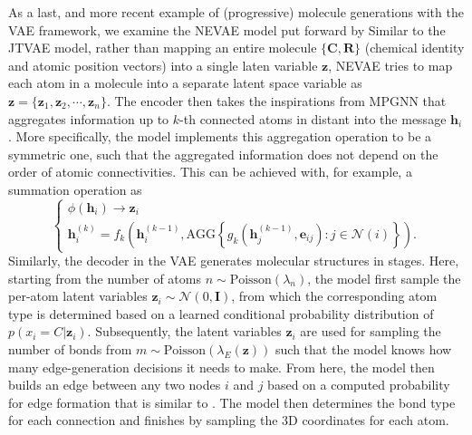 As a last, and more recent example of (progressive) molecule generations with the VAE framework, we examine the NEVAE model put forward by \citet{samanta2020nevae} Similar to the JTVAE model, rather than mapping an entire molecule $\{\bm{C},\bm{R}\}$ (chemical identity and atomic position vectors) into a single laten variable $\bm{z}$, NEVAE tries to map each atom in a molecule into a separate latent space variable as $\bm{z}=\{\bm{z}_1,\bm{z}_2,\cdots, \bm{z}_n\}$. The encoder then takes the inspirations from MPGNN that aggregates information up to $k$-th connected atoms in distant into the message $\bm{h}_i$. More specifically, the model implements this aggregation operation to be a symmetric one, such that the aggregated information does not depend on the order of atomic connectivities. This can be achieved with, for example, a summation operation as
\begin{equation*}
    \begin{cases}
        \phi(\bm{h}_i) \to\bm{z}_i\\
        \bm{h}_{i}^{(k)}=f_k\left( \bm{h}_i^{(k-1)},\mbox{AGG}\left\{  g_k\left(\bm{h}_j^{(k-1)},\bm{e}_{ij}\right): j\in \mathcal{N}(i)\right\} \right).
    \end{cases}
\end{equation*}
Similarly, the decoder in the VAE generates molecular structures in stages. Here, starting from the number of atoms $n\sim\mbox{Poisson}(\lambda_n)$, the model first sample the per-atom latent variables $\bm{z}_i\sim\mathcal{N}(0,\bm{I})$, from which the corresponding atom type is determined based on a learned conditional probability distribution of $p(x_i=C|\bm{z}_i)$. Subsequently, the latent variables $\bm{z}_i$ are used for sampling the number of bonds from $m\sim\mbox{Poisson}(\lambda_{E}(\bm{z}))$ such that the model knows how many edge-generation decisions it needs to make. From here, the model then builds an edge between any two nodes $i$ and $j$ based on a computed probability for edge formation that is similar to \citet{liu2018constrained}. The model then determines the bond type for each connection and finishes by sampling the 3D coordinates for each atom. 


